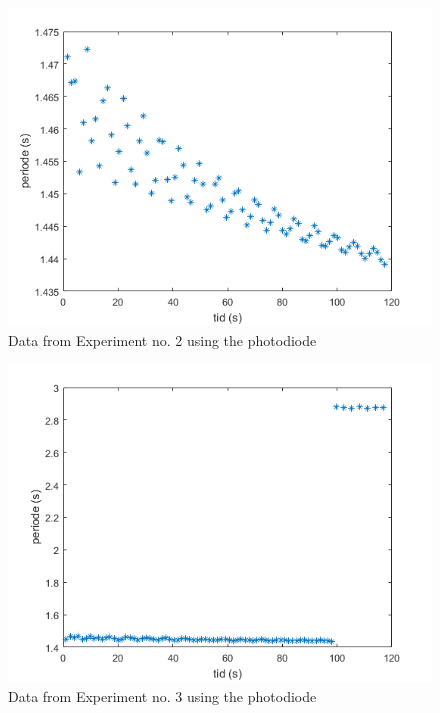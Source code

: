 \documentclass[%
 reprint,
 amsmath,amssymb,
 aps,
]{revtex4-1}
\begin{document}
    \begin{figure}[h!]
    	\center
    	\includegraphics[scale=0.6]{forsok2fig1}
    	\caption{Data from Experiment no. 2 using the photodiode}
    \end{figure}

    \begin{figure}[h!]
    	\center
    	\includegraphics[scale=0.6]{forsok3fig1}
    	\caption{Data from Experiment no. 3 using the photodiode}
    \end{figure}
\end{document}
